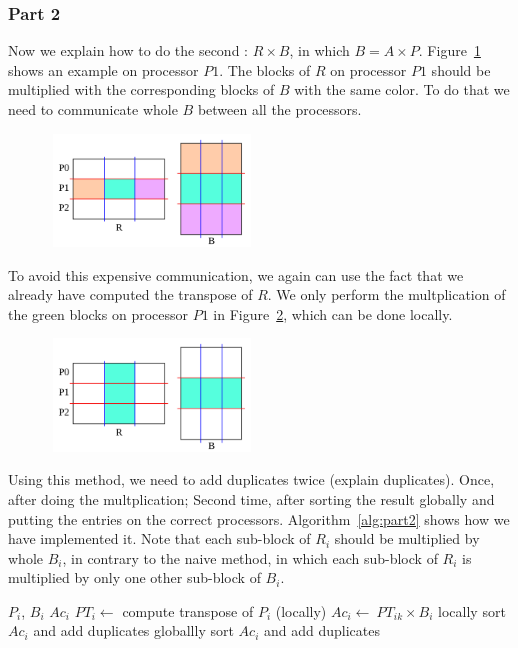 \subsubsection{Part 2}

Now we explain how to do the second \mm: $R \times B$, in which $B = A \times P$. Figure~\ref{fig:part2d} shows an example on processor $P1$. The blocks of $R$ on processor $P1$ should be multiplied with the corresponding blocks of $B$ with the same color. To do that we need to communicate whole $B$ between all the processors.

\begin{figure}[tbh]
 \centering
 \includegraphics[width=5.5cm,height=3cm]{./figures/part2d.pdf}
 \caption{}
 \label{fig:part2d}
\end{figure}

To avoid this expensive communication, we again can use the fact that we already have computed the transpose of $R$. We only perform the multplication of the green blocks on processor $P1$ in Figure~\ref{fig:part2e}, which can be done locally.

\begin{figure}[tbh]
 \centering
 \includegraphics[width=5.5cm,height=3cm]{./figures/part2e.pdf}
 \caption{}
 \label{fig:part2e}
\end{figure}

Using this method, we need to add duplicates twice (explain duplicates). Once, after doing the multplication; Second time, after sorting the result globally and putting the entries on the correct processors. Algorithm~\ref{alg:part2} shows how we have implemented it. Note that each sub-block of $R_i$ should be multiplied by whole $B_i$, in contrary to the naive method, in which each sub-block of $R_i$ is multiplied by only one other sub-block of $B_i$.

\begin{algorithm}[H] 
  \caption{Part 2: $Ac = R \times B$} \label{alg:part2} 
  \begin{algorithmic}[1]
    \Require $P_i$, $B_i$
    \Ensure  $Ac_i$
    \State $PT_i \leftarrow$ compute transpose of $P_i$ (locally)
      \State $Ac_i \leftarrow\ PT_{ik} \times B_i$
    \EndFor
    \State locally sort $Ac_i$ and add duplicates
    \State globallly sort $Ac_i$ and add duplicates
  \end{algorithmic}
\end{algorithm}


